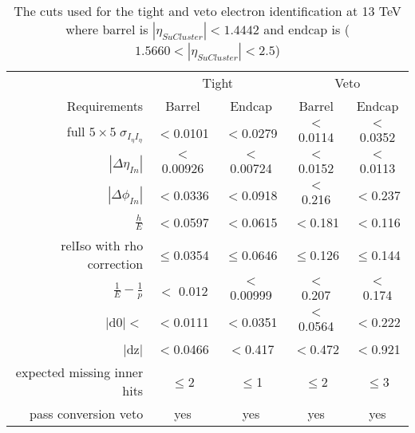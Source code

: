 \begin{table}[htpb!]
\footnotesize
\begin{center}
\begin{tabular}{|r|c|c|c|c|}
\hline
& \multicolumn{2}{c|}{Tight} & \multicolumn{2}{c|}{Veto} \\
\cline{2-5}
Requirements &  Barrel        &   Endcap  &  Barrel        &   Endcap  \\

\hline
full $5\times5 \; \sigma_{I_{\eta}I_{\eta}} $ & $ <$0.0101 & $ <$0.0279 & $ <$0.0114 & $ <$0.0352\\
$|\Delta \eta_{In}| $  & $ <$0.00926 &$ <$ 0.00724  & $ <$0.0152 & $ <$0.0113  \\
$|\Delta \phi_{In}|  $  &  $<$0.0336 & $<$0.0918 & $<$ 0.216 & $<$0.237  \\
$\frac{h}{E} $ &$<$0.0597 & $<$0.0615  &$<$0.181 & $<$0.116  \\
relIso with rho correction    & $\leq$0.0354 & $\leq$0.0646& $\leq$0.126 & $\leq$0.144\\
$\frac{1}{E} - \frac{1}{p}  $ & $<$ 0.012 & $<$ 0.00999  & $<$ 0.207 & $<$ 0.174 \\
$|$d$0| < $  & $<$0.0111 & $<$0.0351  & $<$0.0564 & $<$0.222\\
$|$dz$| $  & $<$0.0466 & $<$0.417 & $<$0.472 & $<$0.921\\
expected missing inner hits  & $\leq$2 & $\leq$1 & $\leq$2 & $\leq$3  \\
pass conversion veto & yes & yes& yes & yes  \\
\hline
\end{tabular}
\caption{The cuts used for the tight and veto electron identification at 13 TeV where barrel is $|\eta_{SuCluster}|< 1.4442$ and endcap is  ($1.5660<|\eta_{SuCluster}|<2.5$)}
\label{tab:electron_tight_cuts13}
\end{center}
\end{table}



